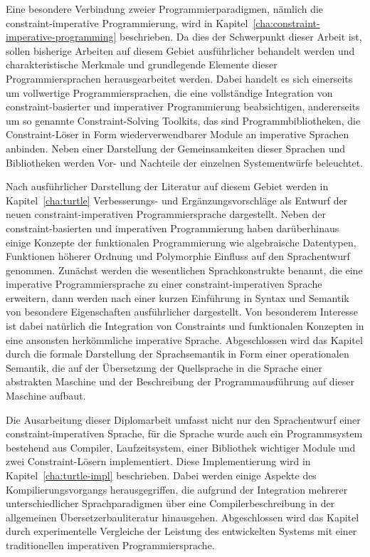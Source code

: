 Eine besondere Verbindung zweier Programmierparadigmen, n\"amlich die
constraint-imperative Programmierung, wird in
Kapitel~\ref{cha:constraint-imperative-programming} beschrieben.  Da
dies der Schwerpunkt dieser Arbeit ist, sollen bisherige Arbeiten auf
diesem Gebiet ausf\"uhrlicher behandelt werden und charakteristische
Merkmale und grundlegende Elemente dieser Programmiersprachen
herausgearbeitet werden.  Dabei handelt es sich einerseits um
vollwertige Programmiersprachen, die eine vollst\"andige Integration
von constraint-basierter und imperativer Programmierung beabsichtigen,
andererseits um so genannte Constraint-Solving Toolkits, das sind
Programmbibliotheken, die Constraint-L\"oser in Form
wiederverwendbarer Module an imperative Sprachen anbinden. Neben einer
Darstellung der Gemeinsamkeiten dieser Sprachen und Bibliotheken
werden Vor- und Nachteile der einzelnen Systementw\"urfe beleuchtet.

Nach ausf\"uhrlicher Darstellung der Literatur auf diesem Gebiet
werden in Kapitel~\ref{cha:turtle} Ver\-bess\-er\-ungs- und
Erg\"anzungsvorschl\"age als Entwurf der neuen
con\-straint-im\-per\-a\-ti\-ven Programmiersprache \turtle{}
dargestellt.  Neben der constraint-basierten und imperativen
Programmierung haben dar\"uberhinaus einige Konzepte der funktionalen
Programmierung wie algebraische Datentypen, Funktionen h\"oherer
Ordnung und Polymorphie Einfluss auf den Sprachentwurf genommen.
Zun\"achst werden die wesentlichen Sprachkonstrukte benannt, die eine
imperative Programmiersprache zu einer constraint-imperativen Sprache
erweitern, dann werden nach einer kurzen Einf\"uhrung in Syntax und
Semantik von \turtle{} besondere Eigenschaften ausf\"uhrlicher
dargestellt.  Von besonderem Interesse ist dabei nat\"urlich die
Integration von Constraints und funktionalen Konzepten in eine
ansonsten herk\"ommliche imperative Sprache.  Abgeschlossen wird das
Kapitel durch die formale Darstellung der Sprachsemantik in Form einer
operationalen Semantik, die auf der \"Ubersetzung der Quellsprache in
die Sprache einer abstrakten Maschine und der Beschreibung der
Programmausf\"uhrung auf dieser Maschine aufbaut.

Die Ausarbeitung dieser Diplomarbeit umfasst nicht nur den
Sprachentwurf einer con\-straint-im\-pe\-ra\-ti\-ven Sprache, f\"ur
die Sprache wurde auch ein Programmsystem bestehend aus Compiler,
Laufzeitsystem, einer Bibliothek wichtiger Module und zwei
Constraint-L\"osern implementiert.  Diese Implementierung wird in
Kapitel~\ref{cha:turtle-impl} beschrieben.  Dabei werden einige
Aspekte des Kompilierungsvorgangs herausgegriffen, die aufgrund der
Integration mehrerer unterschiedlicher Sprachparadigmen \"uber eine
Compilerbeschreibung in der allgemeinen
\"Uber\-setz\-erbau\-li\-te\-ra\-tur hinausgehen.  Abgeschlossen wird
das Kapitel durch experimentelle Vergleiche der Leistung des
entwickelten Systems mit einer traditionellen imperativen
Programmiersprache.


